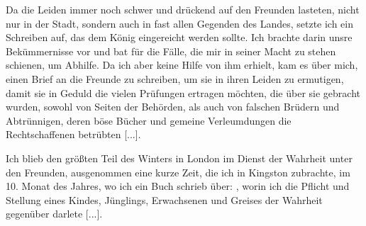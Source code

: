 Da die Leiden immer noch schwer und drückend auf den
Freunden lasteten, nicht nur in der Stadt, sondern auch in fast
allen Gegenden des Landes, setzte ich ein Schreiben auf, das dem
König eingereicht werden sollte. Ich brachte darin unsre 
Bekümmernisse vor und bat für die Fälle, die mir in seiner Macht
zu stehen schienen, um Abhilfe. Da ich aber keine Hilfe von
ihm erhielt, kam es über mich, einen Brief an die Freunde zu
schreiben, um sie in ihren Leiden zu ermutigen, 
damit sie in Geduld die vielen Prüfungen ertragen möchten, die über sie 
gebracht wurden, sowohl von Seiten der Behörden, als auch von
falschen Brüdern und Abtrünnigen, deren böse 
Bücher und gemeine Verleumdungen die Rechtschaffenen betrübten [...].

Ich blieb den größten Teil des Winters in London im Dienst
der Wahrheit unter den Freunden, ausgenommen eine kurze Zeit,
die ich in Kingston zubrachte, im 10. Monat des Jahres, wo ich
ein Buch schrieb über: 
, worin ich die Pflicht und Stellung eines Kindes,
Jünglings, Erwachsenen und Greises der Wahrheit gegenüber darlete [...].

